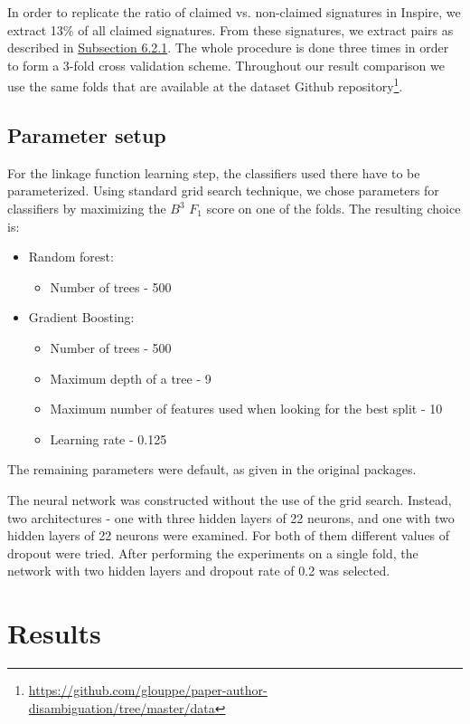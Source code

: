 \documentclass{pracamgr}
\newcommand{\myhy}[2]{\hyperref[#1]{#2}}
\begin{document}
In order to replicate the ratio of claimed vs. non-claimed signatures in Inspire, we
extract 13\% of all claimed signatures. From these signatures, we extract pairs as 
described in \myhy{sec:sampling}{Subsection 6.2.1}. The whole procedure is done three times
in order to form a 3-fold cross validation scheme. Throughout our result comparison we use
the same folds that are available at the dataset Github repository\footnote{\href{https://github.com/glouppe/paper-author-disambiguation/tree/master/data}{https://github.com/glouppe/paper-author-disambiguation/tree/master/data}}.

\section{Parameter setup}
For the linkage function learning step, the classifiers used there have to be parameterized.
Using standard grid search technique, we chose parameters for classifiers
by maximizing the $B^{3}$ $F_{1}$ score on one of the folds. The resulting choice is:

\begin{itemize}
\item{Random forest:}
\begin{itemize}
\item{Number of trees - 500}
\end{itemize}
\item{Gradient Boosting:}
\begin{itemize}
\item{Number of trees - 500}
\item{Maximum depth of a tree - 9}
\item{Maximum number of features used when looking for the best split - 10}
\item{Learning rate - 0.125}
\end{itemize}
\end{itemize}

The remaining parameters were default, as given in the original packages.

The neural network was constructed without the use of the grid search. Instead, two
architectures - one with three hidden layers of 22 neurons, and one with two hidden
layers of 22 neurons were examined. For both of them different values of dropout were tried.
After performing the experiments on a single fold, the network with two hidden layers and
dropout rate of 0.2 was selected.

\chapter{Results}
\end{document}
